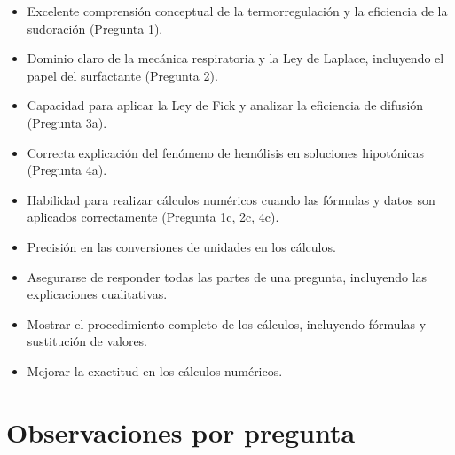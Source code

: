 \documentclass[11pt,a4paper]{article}
\begin{document}
\vspace{4pt}
\begin{minipage}[t]{0.48\linewidth}
  \begin{tcolorbox}[cajaFortaleza, title={Fortalezas}]
\begin{itemize}[leftmargin=1.5em, itemsep=2pt]
  \item Excelente comprensión conceptual de la termorregulación y la eficiencia de la sudoración (Pregunta 1).
  \item Dominio claro de la mecánica respiratoria y la Ley de Laplace, incluyendo el papel del surfactante (Pregunta 2).
  \item Capacidad para aplicar la Ley de Fick y analizar la eficiencia de difusión (Pregunta 3a).
  \item Correcta explicación del fenómeno de hemólisis en soluciones hipotónicas (Pregunta 4a).
  \item Habilidad para realizar cálculos numéricos cuando las fórmulas y datos son aplicados correctamente (Pregunta 1c, 2c, 4c).
\end{itemize}
  \end{tcolorbox}
\end{minipage}
\hfill
\begin{minipage}[t]{0.48\linewidth}
  \begin{tcolorbox}[cajaMejora, title={Areas de mejora}]
\begin{itemize}[leftmargin=1.5em, itemsep=2pt]
  \item Precisión en las conversiones de unidades en los cálculos.
  \item Asegurarse de responder todas las partes de una pregunta, incluyendo las explicaciones cualitativas.
  \item Mostrar el procedimiento completo de los cálculos, incluyendo fórmulas y sustitución de valores.
  \item Mejorar la exactitud en los cálculos numéricos.
\end{itemize}
  \end{tcolorbox}
\end{minipage}

\section*{Observaciones por pregunta}
\end{document}
